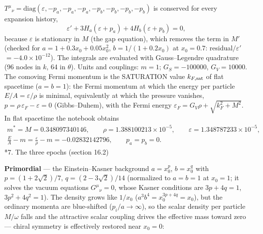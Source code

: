 \documentclass[10pt,a4paper]{article}
\makeatletter
\renewcommand\section{\@startsection{section}{1}{\z@}{-3.5ex \@plus -1ex \@minus -.2ex}{2.3ex \@plus.2ex}{\normalfont\Large\bfseries\raggedright}}
\makeatother
\begin{document}
$T^\mu{}_\nu=\mathrm{diag}(\varepsilon,-p_a,-p_a,-p_a,-p_b,-p_b,-p_b,-p_b)$ is conserved for every expansion history,
\begin{equation*}
\varepsilon'+3H_a(\varepsilon+p_a)+4H_b(\varepsilon+p_b)=0,
\end{equation*}
because $\varepsilon$ is stationary in $M$ (the gap equation), which removes the term in $M'$ (checked for $a=1+0.3x_0+0.05x_0^2$, $b=1/(1+0.2x_0)$ at $x_0=0.7$: residual$/\varepsilon'$ $=-4.0\times10^{-12}$). The integrals are evaluated with Gauss–Legendre quadrature (96 nodes in $k$, 64 in $\theta$). Units and couplings: $m=1$; $G_S=-100000$, $G_V=10000$. The comoving Fermi momentum is the SATURATION value $k_{F,\rm sat}$ of flat spacetime ($a=b=1$): the Fermi momentum at which the energy per particle $E/A=\varepsilon/\rho$ is minimal, equivalently at which the pressure vanishes, $p=\rho\,\varepsilon_F-\varepsilon=0$ (Gibbs–Duhem), with the Fermi energy $\varepsilon_F=G_V\rho+\sqrt{k_F^2+M^2}$. In flat spacetime the notebook obtains
\begin{gather*}
m^*=M=0.348097340146,\qquad \rho=1.388100213\times10^{-5},\qquad \varepsilon=1.348787233\times10^{-5},\\ \frac{E}{A}-m=\frac{\varepsilon}{\rho}-m=-0.02832142796,\qquad p_a=p_b=0 .
\end{gather*}
\section*{7. The three epochs (section 16.2)}
\textbf{Primordial} — the Einstein–Kasner background $a=x_0^{p}$, $b=x_0^{q}$ with $p=(1+2\sqrt2)/7$, $q=(2-3\sqrt2)/14$ (normalized to $a=b=1$ at $x_0=1$; it solves the vacuum equations $G^\mu{}_\nu=0$, whose Kasner conditions are $3p+4q=1$, $3p^2+4q^2=1$). The density grows like $1/x_0$ ($a^3b^4=x_0^{3p+4q}=x_0$), but the ordinary momenta are blue-shifted ($p_i/a\to\infty$), so the scalar density per particle $M/\omega$ falls and the attractive scalar coupling drives the effective mass toward zero — chiral symmetry is effectively restored near $x_0=0$:
\end{document}
